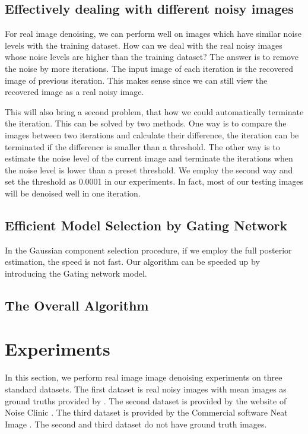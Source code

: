 \documentclass[10pt,twocolumn,letterpaper]{article}
\begin{document}
\subsection{Effectively dealing with different noisy images}
For real image denoising, we can perform well on images which have similar noise levels with the training dataset. How can we deal with the real noisy images whose noise levels are higher than the training dataset? The answer is to remove the noise by more iterations. The input image of each iteration is the recovered image of previous iteration. This makes sense since we can still view the recovered image as a real noisy image. 

This will also bring a second problem, that how we could automatically terminate the iteration. This can be solved by two methods. One way is to compare the images between two iterations and calculate their difference, the iteration can be terminated if the difference is smaller than a threshold. The other way is to estimate the noise level of the current image and terminate the iterations when the noise level is lower than a preset threshold. We employ the second way and set the threshold as 0.0001 in our experiments. In fact, most of our testing images will be denoised well in one iteration.

\subsection{Efficient Model Selection by Gating Network}
In the Gaussian component selection procedure, if we employ the full posterior estimation, the speed is not fast. Our algorithm can be speeded up by introducing the Gating network model.

\subsection{The Overall Algorithm}



\section{Experiments}
In this section, we perform real image image denoising experiments on three standard datasets. The first dataset is real noisy images with mean images as ground truths provided by \cite{crosschannel2016}. The second dataset is provided by the website of Noise Clinic \cite{noiseclinic}. The third dataset is provided by the Commercial software Neat Image \cite{neatimage}. The second and third dataset do not have ground truth images.
\end{document}
